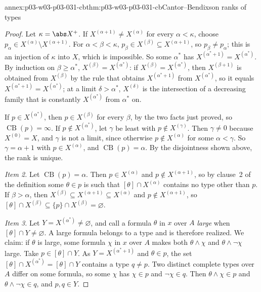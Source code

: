 \begin{annexitem}{annex:p03-w03-p03-031-cb}{thm:p03-w03-p03-031-cb}{Cantor--Bendixson ranks of types}
\begin{proof}
Let \(\kappa=\abs X^+\).  If \(X^{(\alpha+1)}\neq X^{(\alpha)}\) for every
\(\alpha<\kappa\), choose \(p_\alpha\in X^{(\alpha)}\setminus
X^{(\alpha+1)}\).  For \(\alpha<\beta<\kappa\),
\(p_\beta\in X^{(\beta)}\subseteq X^{(\alpha+1)}\), so
\(p_\beta\neq p_\alpha\); this is an injection of \(\kappa\) into \(X\),
which is impossible.  So some \(\alpha^*\) has
\(X^{(\alpha^*+1)}=X^{(\alpha^*)}\).  By induction on \(\beta\geq\alpha^*\),
\(X^{(\beta)}=X^{(\alpha^*)}\): if \(X^{(\beta)}=X^{(\alpha^*)}\), then
\(X^{(\beta+1)}\) is obtained from \(X^{(\beta)}\) by the rule that
obtains \(X^{(\alpha^*+1)}\) from \(X^{(\alpha^*)}\), so it equals
\(X^{(\alpha^*+1)}=X^{(\alpha^*)}\); at a limit \(\delta>\alpha^*\),
\(X^{(\delta)}\) is the intersection of a decreasing family that is
constantly \(X^{(\alpha^*)}\) from \(\alpha^*\) on.

If \(p\in X^{(\alpha^*)}\), then \(p\in X^{(\beta)}\) for every \(\beta\),
by the two facts just proved, so \(\operatorname{CB}(p)=\infty\).  If
\(p\notin X^{(\alpha^*)}\), let \(\gamma\) be least with
\(p\notin X^{(\gamma)}\).  Then \(\gamma\neq0\) because \(X^{(0)}=X\), and
\(\gamma\) is not a limit, since otherwise \(p\notin X^{(\alpha)}\) for some
\(\alpha<\gamma\).  So \(\gamma=\alpha+1\) with \(p\in X^{(\alpha)}\), and
\(\operatorname{CB}(p)=\alpha\).  By the disjointness shown above, the rank
is unique.

\emph{Item 2.}  Let \(\operatorname{CB}(p)=\alpha\).  Then
\(p\in X^{(\alpha)}\) and \(p\notin X^{(\alpha+1)}\), so by clause~2 of
the definition some \(\theta\in p\) is such that \([\theta]\cap
X^{(\alpha)}\) contains no type other than \(p\).  If \(\beta>\alpha\),
then \(X^{(\beta)}\subseteq X^{(\alpha+1)}\subseteq X^{(\alpha)}\) and
\(p\notin X^{(\alpha+1)}\), so \([\theta]\cap X^{(\beta)}\subseteq
\{p\}\cap X^{(\beta)}=\varnothing\).

\emph{Item 3.}  Let \(Y=X^{(\alpha^*)}\neq\varnothing\), and call a
formula \(\theta\) in \(x\) over \(A\) \emph{large} when
\([\theta]\cap Y\neq\varnothing\).  A large formula belongs to a type and
is therefore realized.  We claim: if \(\theta\) is large, some formula
\(\chi\) in \(x\) over \(A\) makes both \(\theta\wedge\chi\) and
\(\theta\wedge\neg\chi\) large.  Take \(p\in[\theta]\cap Y\).  As
\(Y=X^{(\alpha^*+1)}\) and \(\theta\in p\), the set
\([\theta]\cap X^{(\alpha^*)}=[\theta]\cap Y\) contains a type
\(q\neq p\).  Two distinct complete types over \(A\) differ on some
formula, so some \(\chi\) has \(\chi\in p\) and \(\neg\chi\in q\).  Then
\(\theta\wedge\chi\in p\) and \(\theta\wedge\neg\chi\in q\), and
\(p,q\in Y\).


\end{proof}
\end{annexitem}
